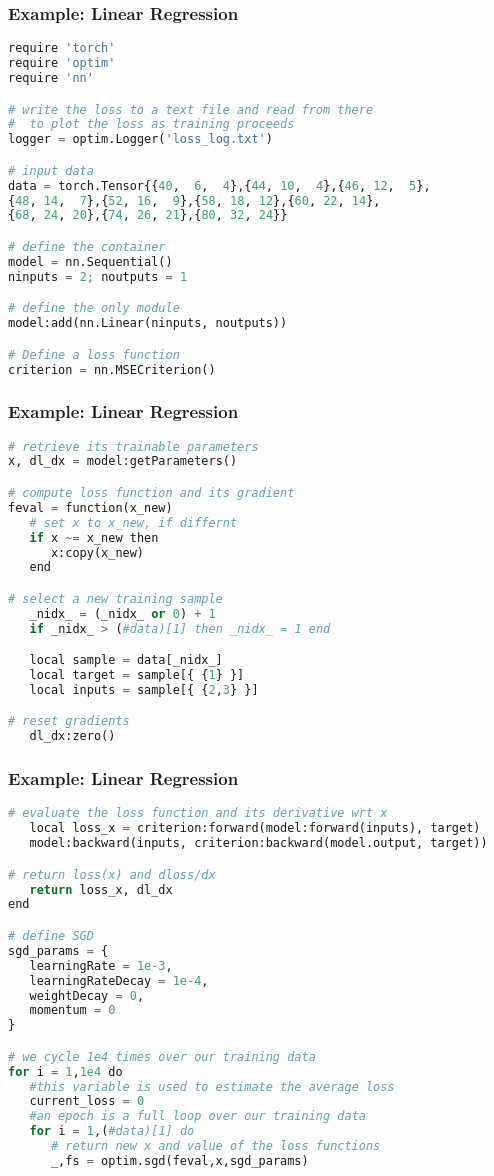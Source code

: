 \begin{frame}[fragile]
\MyLogo
\frametitle{Example: Linear Regression}  
\scriptsize{
\begin{lstlisting}[language=python]
require 'torch'
require 'optim'
require 'nn'

# write the loss to a text file and read from there 
#  to plot the loss as training proceeds
logger = optim.Logger('loss_log.txt')

# input data 
data = torch.Tensor{{40,  6,  4},{44, 10,  4},{46, 12,  5},
{48, 14,  7},{52, 16,  9},{58, 18, 12},{60, 22, 14},
{68, 24, 20},{74, 26, 21},{80, 32, 24}}

# define the container
model = nn.Sequential()                 
ninputs = 2; noutputs = 1

# define the only module
model:add(nn.Linear(ninputs, noutputs)) 

# Define a loss function
criterion = nn.MSECriterion()
\end{lstlisting}
}
\end{frame}

\begin{frame}[fragile]
\MyLogo
\frametitle{Example: Linear Regression}  
\ContinueLineNumber
\scriptsize{
\begin{lstlisting}[language=python]
# retrieve its trainable parameters
x, dl_dx = model:getParameters()

# compute loss function and its gradient 
feval = function(x_new)
   # set x to x_new, if differnt
   if x ~= x_new then
      x:copy(x_new)
   end

# select a new training sample
   _nidx_ = (_nidx_ or 0) + 1
   if _nidx_ > (#data)[1] then _nidx_ = 1 end

   local sample = data[_nidx_]
   local target = sample[{ {1} }]    
   local inputs = sample[{ {2,3} }] 

# reset gradients
   dl_dx:zero()
\end{lstlisting}
}
\end{frame}

\begin{frame}[fragile]
\MyLogo
\frametitle{Example: Linear Regression}  
\ContinueLineNumber
\scriptsize{
\begin{lstlisting}[language=python]
# evaluate the loss function and its derivative wrt x
   local loss_x = criterion:forward(model:forward(inputs), target)
   model:backward(inputs, criterion:backward(model.output, target))

# return loss(x) and dloss/dx
   return loss_x, dl_dx
end

# define SGD 
sgd_params = {
   learningRate = 1e-3,
   learningRateDecay = 1e-4,
   weightDecay = 0,
   momentum = 0
}

# we cycle 1e4 times over our training data
for i = 1,1e4 do
   #this variable is used to estimate the average loss
   current_loss = 0
   #an epoch is a full loop over our training data
   for i = 1,(#data)[1] do
      # return new x and value of the loss functions
      _,fs = optim.sgd(feval,x,sgd_params)
\end{lstlisting}
}
\end{frame}

